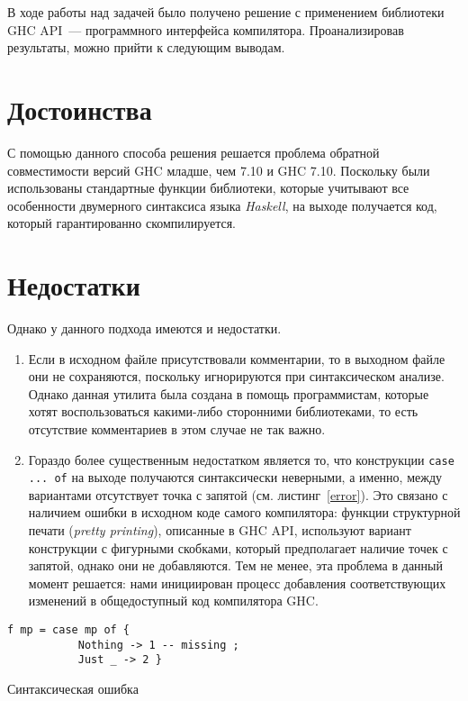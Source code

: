 \Conc
В ходе работы над задачей было получено решение с применением библиотеки GHC API~--- программного интерфейса компилятора. Проанализировав результаты, можно прийти к следующим выводам.
\section*{Достоинства}
С помощью данного способа решения решается проблема обратной совместимости версий GHC младше, чем 7.10 и GHC 7.10. Поскольку были использованы стандартные функции библиотеки, которые учитывают все особенности двумерного синтаксиса языка \textit{Haskell}, на выходе получается код, который гарантированно скомпилируется.
\section*{Недостатки}
Однако у данного подхода имеются и недостатки.
\begin{enumerate}
\item Если в исходном файле присутствовали комментарии, то в выходном файле они не сохраняются, поскольку игнорируются при синтаксическом анализе. Однако данная утилита была создана в помощь программистам, которые хотят воспользоваться какими-либо сторонними библиотеками, то есть отсутствие комментариев в этом случае не так важно.
\item Гораздо более существенным недостатком является то, что конструкции \lstinline{case ... of} на выходе получаются синтаксически неверными, а именно, между вариантами отсутствует точка с запятой (см. листинг~\ref{error}). Это связано с наличием ошибки в исходном коде самого компилятора: функции структурной печати (\textit{pretty printing}), описанные в GHC API, используют вариант конструкции с фигурными скобками, который предполагает наличие точек с запятой, однако они не добавляются. Тем не менее, эта проблема в данный момент решается: нами инициирован процесс добавления соответствующих изменений в общедоступный код компилятора GHC.
\end{enumerate}

\begin{ListingEnv}[h]
    \begin{lstlisting}
f mp = case mp of {
           Nothing -> 1 -- missing ;
           Just _ -> 2 }
    \end{lstlisting}
\caption{Синтаксическая ошибка}\label{error}
\end{ListingEnv}

\printbibliography[%
    heading=bibintoc%
]

